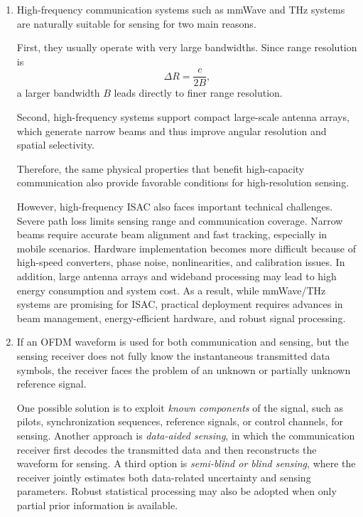 \begin{enumerate}[label=\textbf{\arabic*.}, leftmargin=*]
\begin{sloppypar}
    The key benefit is that the communication network is no longer only a transport pipe, but an active participant in perception and control.
    \end{sloppypar}
    
    \item 
    High-frequency communication systems such as mmWave and THz systems are naturally suitable for sensing for two main reasons.

    First, they usually operate with very large bandwidths. Since range resolution is
    \[
        \Delta R = \frac{c}{2B},
    \]
    a larger bandwidth \(B\) leads directly to finer range resolution.

    Second, high-frequency systems support compact large-scale antenna arrays, which generate narrow beams and thus improve angular resolution and spatial selectivity.

    Therefore, the same physical properties that benefit high-capacity communication also provide favorable conditions for high-resolution sensing.

    However, high-frequency ISAC also faces important technical challenges. Severe path loss limits sensing range and communication coverage. Narrow beams require accurate beam alignment and fast tracking, especially in mobile scenarios. Hardware implementation becomes more difficult because of high-speed converters, phase noise, nonlinearities, and calibration issues. In addition, large antenna arrays and wideband processing may lead to high energy consumption and system cost. As a result, while mmWave/THz systems are promising for ISAC, practical deployment requires advances in beam management, energy-efficient hardware, and robust signal processing.

    \item 
    If an OFDM waveform is used for both communication and sensing, but the sensing receiver does not fully know the instantaneous transmitted data symbols, the receiver faces the problem of an unknown or partially unknown reference signal.

    One possible solution is to exploit \emph{known components} of the signal, such as pilots, synchronization sequences, reference signals, or control channels, for sensing. Another approach is \emph{data-aided sensing}, in which the communication receiver first decodes the transmitted data and then reconstructs the waveform for sensing. A third option is \emph{semi-blind or blind sensing}, where the receiver jointly estimates both data-related uncertainty and sensing parameters. Robust statistical processing may also be adopted when only partial prior information is available.


\end{enumerate}
